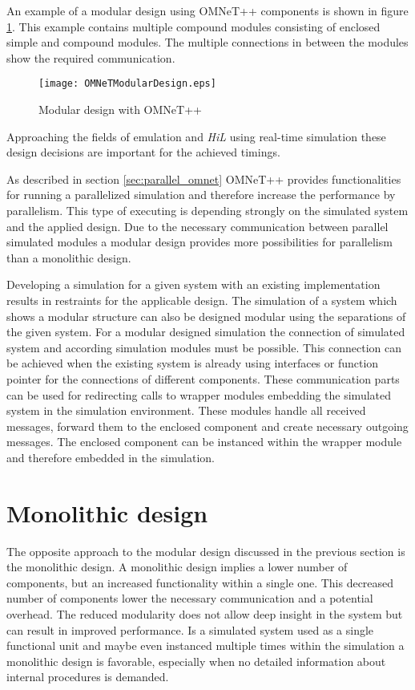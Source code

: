 An example of a modular design using OMNeT++ components is shown in figure \ref{fig:OMNeTModularDesign}.
This example contains multiple compound modules consisting of enclosed simple and compound modules.
The multiple connections in between the modules show the required communication.

\begin{figure}
    \centering
    \texttt{[image: OMNeTModularDesign.eps]}
    \caption{Modular design with OMNeT++}
    \label{fig:OMNeTModularDesign}
\end{figure}

Approaching the fields of emulation and \emph{HiL} using real-time simulation these design decisions are important for the achieved timings.

As described in section \ref{sec:parallel_omnet} OMNeT++ provides functionalities for running a parallelized simulation and therefore increase the performance by parallelism.
This type of executing is depending strongly on the simulated system and the applied design.
Due to the necessary communication between parallel simulated modules a modular design provides more possibilities for parallelism than a monolithic design.

Developing a simulation for a given system with an existing implementation results in restraints for the applicable design.
The simulation of a system which shows a modular structure can also be designed modular using the separations of the given system.
For a modular designed simulation the connection of simulated system and according simulation modules must be possible.
This connection can be achieved when the existing system is already using interfaces or function pointer for the connections of different components.
These communication parts can be used for redirecting calls to wrapper modules embedding the simulated system in the simulation environment.
These modules handle all received messages, forward them to the enclosed component and create necessary outgoing messages.
The enclosed component can be instanced within the wrapper module and therefore embedded in the simulation.

\section{Monolithic design}
\label{sec:design_monolithic}
The opposite approach to the modular design discussed in the previous section is the monolithic design.
A monolithic design implies a lower number of components, but an increased functionality within a single one.
This decreased number of components lower the necessary communication and a potential overhead.
The reduced modularity does not allow deep insight in the system but can result in improved performance.
Is a simulated system used as a single functional unit and maybe even instanced multiple times within the simulation a monolithic design is favorable, especially when no detailed information about internal procedures is demanded.

